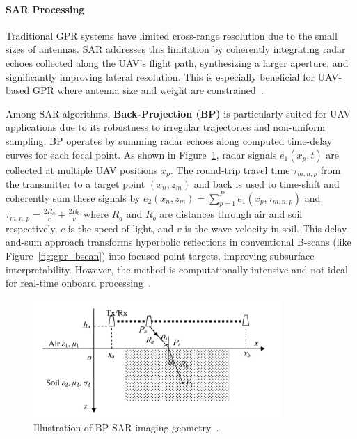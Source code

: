 \paragraph{\gls{SAR} Processing}

Traditional \gls{GPR} systems have limited cross-range resolution due to the small sizes of antennas. \gls{SAR} addresses this limitation by coherently integrating radar echoes collected along the \gls{UAV}’s flight path, synthesizing a larger aperture, and significantly improving lateral resolution. This is especially beneficial for \gls{UAV}-based \gls{GPR} where antenna size and weight are constrained~\cite{9758040}.

Among \gls{SAR} algorithms, \textbf{Back-Projection (\gls{BP})} is particularly suited for \gls{UAV} applications due to its robustness to irregular trajectories and non-uniform sampling. \gls{BP} operates by summing radar echoes along computed time-delay curves for each focal point. As shown in Figure~\ref{fig:bp_geometry}, radar signals $e_1(x_p, t)$ are collected at multiple \gls{UAV} positions $x_p$. The round-trip travel time $\tau_{m,n,p}$ from the transmitter to a target point $(x_n, z_m)$ and back is used to time-shift and coherently sum these signals by \(e_2(x_n, z_m) = \sum_{p=1}^{P} e_1(x_p, \tau_{m,n,p})\) and \(\tau_{m,n,p} = \frac{2R_a}{c} + \frac{2R_b}{v}\) where $R_a$ and $R_b$ are distances through air and soil respectively, $c$ is the speed of light, and $v$ is the wave velocity in soil. This delay-and-sum approach transforms hyperbolic reflections in conventional B-scans (like Figure~\ref{fig:gpr_bscan}) into focused point targets, improving subsurface interpretability. However, the method is computationally intensive and not ideal for real-time onboard processing~\cite{lei2014multi}.

\begin{figure}[H]
    \centering
    \includegraphics[height=4.5cm]{figs/Huirui/bp_geometry.png}
    \caption{Illustration of \gls{BP} \gls{SAR} imaging geometry~\cite{lei2014multi}.}
    \label{fig:bp_geometry}
\end{figure}


